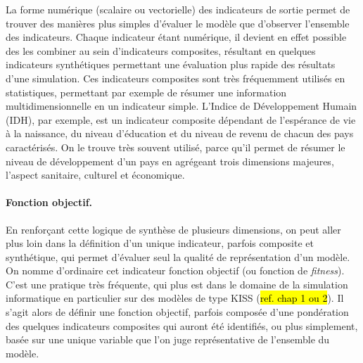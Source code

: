 La forme numérique
(scalaire ou vectorielle) des indicateurs de sortie permet de trouver des manières plus simples d'évaluer le modèle que d'observer l'ensemble des indicateurs.
Chaque indicateur étant numérique, il devient en effet possible des les combiner au sein d'indicateurs composites, résultant en quelques indicateurs synthétiques permettant une évaluation plus rapide des résultats d'une simulation.
Ces indicateurs composites sont très fréquemment utilisés en statistiques, permettant par exemple de résumer une information multidimensionnelle en un indicateur simple.
L'Indice de Développement Humain (IDH), par exemple, est un indicateur composite dépendant de l'espérance de vie à la naissance, du niveau d'éducation et du niveau de revenu de chacun des pays caractérisés.
On le trouve très souvent utilisé, parce qu'il permet de résumer le niveau de développement d'un pays en agrégeant trois dimensions majeures, l'aspect sanitaire, culturel et économique.

\paragraph{Fonction objectif.}

En renforçant cette logique de synthèse de plusieurs dimensions, on peut aller plus loin dans la définition d'un unique indicateur, parfois composite et synthétique, qui permet d'évaluer seul la qualité de représentation d'un modèle.
On nomme d'ordinaire cet indicateur \og fonction objectif\fg{} (ou \og fonction de \textit{fitness}\fg{}).
C'est une pratique très fréquente, qui plus est dans le domaine de la simulation informatique en particulier sur des modèles de type \og KISS\fg{} (\hl{ref. chap 1 ou 2}).
Il s'agit alors de définir une \og fonction objectif\fg{}, parfois composée d'une pondération des quelques indicateurs composites qui auront été identifiés, ou plus simplement, basée sur une unique variable que l'on juge représentative de l'ensemble du modèle.

